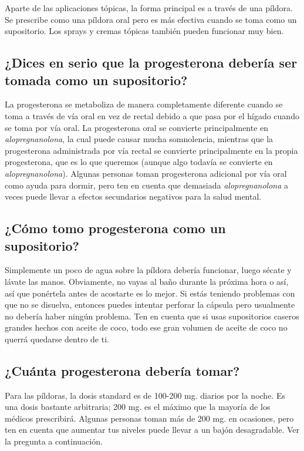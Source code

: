 \documentclass{article}
\begin{document}
Aparte de las aplicaciones tópicas, la forma principal es a través de una píldora. Se prescribe como una píldora oral pero es más efectiva cuando se toma como un supositorio. Los sprays y cremas tópicas también pueden funcionar muy bien.

\subsection{¿Dices en serio que la progesterona debería ser tomada como un supositorio?}

La progesterona se metaboliza de manera completamente diferente cuando se toma a través de vía oral en vez de rectal debido a que pasa por el hígado cuando se toma por vía oral. La progesterona oral se convierte principalmente en \textit{alopregnanolona}, la cual puede causar mucha somnolencia, mientras que la progesterona administrada por vía rectal se convierte principalmente en la propia progesterona, que es lo que queremos (aunque algo todavía se convierte en \textit{alopregnanolona}). Algunas personas toman progesterona adicional por vía oral como ayuda para dormir, pero ten en cuenta que demasiada \textit{alopregnanolona} a veces puede llevar a efectos secundarios negativos para la salud mental.

\subsection{¿Cómo tomo progesterona como un supositorio?}

Simplemente un poco de agua sobre la píldora debería funcionar, luego sécate y lávate las manos. Obviamente, no vayas al baño durante la próxima hora o así, así que ponértela antes de acostarte es lo mejor. Si estás teniendo problemas con que no se disuelva, entonces puedes intentar perforar la cápsula pero usualmente no debería haber ningún problema. Ten en cuenta que si usas supositorios caseros grandes hechos con aceite de coco, todo ese gran volumen de aceite de coco no querrá quedarse dentro de ti.

\subsection{¿Cuánta progesterona debería tomar?}

Para las píldoras, la dosis standard es de 100-200 mg. diarios por la noche. Es una dosis bastante arbitraria; 200 mg. es el máximo que la mayoría de los médicos prescribirá. Algunas personas toman más de 200 mg. en ocasiones, pero ten en cuenta que aumentar tus niveles puede llevar a un bajón desagradable. Ver la pregunta a continuación.
\end{document}
